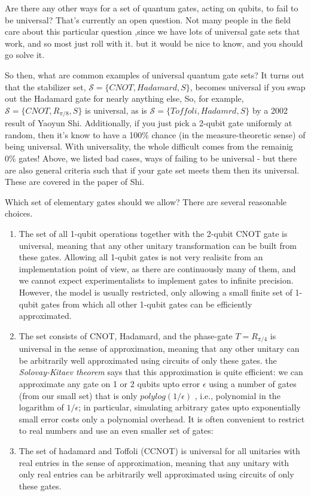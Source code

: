 Are there any other ways for a set of quantum gates, acting on qubits, to fail to be universal? That's currently an open question. Not many people in the field care about this particular question ,since we have lots of universal gate sets that work, and so most just roll with it. but it would be nice to know, and you should go solve it.

So then, what are common examples of universal quantum gate sets? It turns out that the stabilizer set, $\mathcal{S}=\{CNOT, Hadamard, S\}$, becomes universal if you swap out the Hadamard gate for nearly anything else, So, for example, $\mathcal{S}=\{CNOT, R_{\pi/8}, S\}$ is universal, as is $\mathcal{S}=\{Toffoli, Hadamrd,S\}$ by a 2002 result of Yaoyun Shi. Additionally, if you just pick a 2-qubit gate uniformly at random, then it's know to have a 100\% chance (in the measure-theoretic sense) of being universal. With universality, the whole difficult comes from the remainig 0\% gates! Above, we listed bad cases, ways of failing to be universal - but there are also general criteria such that if your gate set meets them then its universal. These are covered in the paper of Shi.


Which set of elementary gates should we allow? There are several reasonable choices. 

\begin{enumerate}
    \item The set of all 1-qubit operations together with the 2-qubit CNOT gate is universal, meaning that any other unitary transformation can be built from these gates. Allowing all 1-qubit gates is not very realisitc from an implementation point of view, as there are continuously many of them, and we cannot expect experimentalists to implement gates to infinite precision. However, the model is usually restricted, only allowing a small finite set of 1-qubit gates from which all other 1-qubit gates can be efficiently approximated.
    \item The set consists of CNOT, Hadamard, and the phase-gate $T=R_{\pi/4}$ is universal in the sense of approximation, meaning that any other unitary can be arbitrarily well approximated using circuits of only these gates. the \textit{Solovay-Kitaev theorem} says that this approximation is quite efficient: we can approximate any gate on 1 or 2 qubits upto error $\epsilon$ using a number of gates (from our small set) that is only $polylog(1/\epsilon)$ , i.e., polynomial in the logarithm of $1/\epsilon$; in particular, simulating arbitrary gates upto exponentially small error costs only a polynomial overhead. It is often convenient to restrict to real numbers and use an even smaller set of gates:
    \item The set of hadamard and Toffoli (CCNOT) is universal for all unitaries with real entries in the sense of approximation, meaning that any unitary with only real entries can be arbitrarily well approximated using circuits of only these gates.
\end{enumerate}

